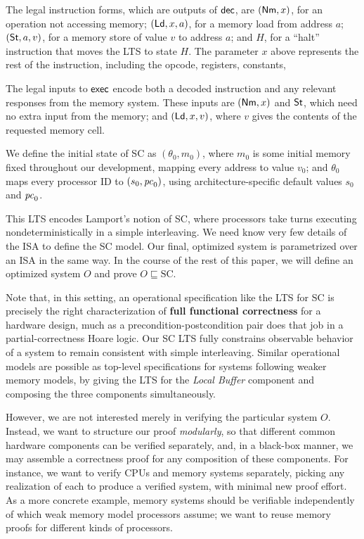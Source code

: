 The legal instruction forms, which are outputs of $\mathsf{dec}$, are $(\mathsf{Nm}, x)$, for
an operation not accessing memory; $(\mathsf{Ld}, x, a)$, for a memory load from
address $a$; $(\mathsf{St}, a, v)$, for a memory store of value $v$ to address $a$; and
$H$, for a ``halt'' instruction that moves the LTS to state $H$. The parameter
$x$ above represents the rest of the instruction, including the
opcode, registers, constants, \etc{}

The legal inputs to $\mathsf{exec}$ encode both a decoded instruction and any relevant
responses from the memory system.  These inputs are $(\mathsf{Nm}, x)$ and $\mathsf{St}$, which
need no extra input from the memory; and $(\mathsf{Ld}, x, v)$, where $v$ gives the
contents of the requested memory cell.

We define the initial state of SC as $(\theta_0, m_0)$, where $m_0$ is
some initial memory fixed throughout our development, mapping every
address to value $v_0$; and $\theta_0$ maps every processor ID to
$(s_0, \mathit{pc}_0)$, using architecture-specific default values $s_0$ and
$\mathit{pc}_0$.


This LTS encodes Lamport's notion of SC, where processors take turns executing
nondeterministically in a simple interleaving.  We need know very few details
of the ISA to define the SC model.  Our final, optimized system is parametrized
over an ISA in the same way.  In the course of the rest of this paper, we will
define an optimized system $O$ and prove $O \sqsubseteq \text{SC}$.

Note that, in this setting, an operational specification like the LTS
for SC is precisely the right characterization of \textbf{full functional
  correctness} for a hardware design, much as a
precondition-postcondition pair does that job in a partial-correctness
Hoare logic.  Our SC LTS fully constrains observable behavior of a
system to remain consistent with simple interleaving.  Similar
operational models are possible as top-level specifications for
systems following weaker memory models, by giving the LTS for the \emph{Local
Buffer} component and composing the three components simultaneously.

However, we are not interested merely in verifying the particular system $O$.
Instead, we want to structure our proof \emph{modularly}, so that different
common hardware components can be verified separately, and, in a black-box
manner, we may assemble a correctness proof for any composition of these
components.  For instance, we want to verify CPUs and memory systems
separately, picking any realization of each to produce a verified system, with
minimal new proof effort. As a more concrete example, memory systems should be
verifiable independently of which weak memory model processors assume; we want
to reuse memory proofs for different kinds of processors.

